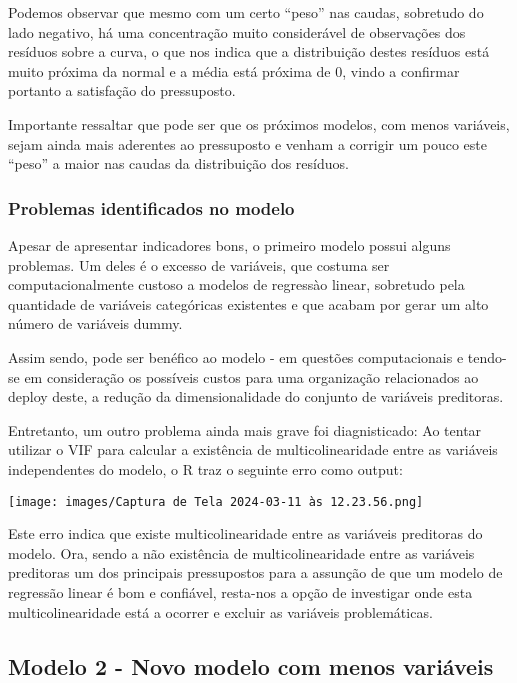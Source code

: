 \documentclass[
  letterpaper,
  DIV=11,
  numbers=noendperiod]{scrartcl}
\begin{document}
Podemos observar que mesmo com um certo ``peso'' nas caudas, sobretudo
do lado negativo, há uma concentração muito considerável de observações
dos resíduos sobre a curva, o que nos indica que a distribuição destes
resíduos está muito próxima da normal e a média está próxima de 0, vindo
a confirmar portanto a satisfação do pressuposto.

Importante ressaltar que pode ser que os próximos modelos, com menos
variáveis, sejam ainda mais aderentes ao pressuposto e venham a corrigir
um pouco este ``peso'' a maior nas caudas da distribuição dos resíduos.

\subsubsection{Problemas identificados no
modelo}\label{problemas-identificados-no-modelo}

Apesar de apresentar indicadores bons, o primeiro modelo possui alguns
problemas. Um deles é o excesso de variáveis, que costuma ser
computacionalmente custoso a modelos de regressào linear, sobretudo pela
quantidade de variáveis categóricas existentes e que acabam por gerar um
alto número de variáveis dummy.

Assim sendo, pode ser benéfico ao modelo - em questões computacionais e
tendo-se em consideração os possíveis custos para uma organização
relacionados ao deploy deste, a redução da dimensionalidade do conjunto
de variáveis preditoras.

Entretanto, um outro problema ainda mais grave foi diagnisticado: Ao
tentar utilizar o VIF para calcular a existência de multicolinearidade
entre as variáveis independentes do modelo, o R traz o seguinte erro
como output:

\begin{center}
\texttt{[image: images/Captura de Tela 2024-03-11 às 12.23.56.png]}
\end{center}

Este erro indica que existe multicolinearidade entre as variáveis
preditoras do modelo. Ora, sendo a não existência de multicolinearidade
entre as variáveis preditoras um dos principais pressupostos para a
assunção de que um modelo de regressão linear é bom e confiável,
resta-nos a opção de investigar onde esta multicolinearidade está a
ocorrer e excluir as variáveis problemáticas.

\subsection{Modelo 2 - Novo modelo com menos
variáveis}\label{modelo-2---novo-modelo-com-menos-variuxe1veis}
\end{document}
